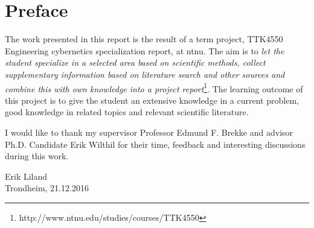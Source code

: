 
\section*{Preface}
The work presented in this report is the result of a term project, TTK4550 Engineering cybernetics specialization report, at \gls{ntnu}. The aim is to \emph{let the student specialize in a selected area based on scientific methods, collect supplementary information based on literature search and other sources and combine this with own knowledge into a project report}\footnote{http://www.ntnu.edu/studies/courses/TTK4550}. The learning outcome of this project is to give the student an extensive knowledge in a current problem, good knowledge in related topics and relevant scientific literature.

I would like to thank my supervisor Professor Edmund F. Brekke and advisor Ph.D. Candidate Erik Wilthil for their time, feedback and interesting discussions during this work. 

\vspace{4cm} 
\begin{center}
Erik Liland \\
Trondheim, 21.12.2016
\end{center}